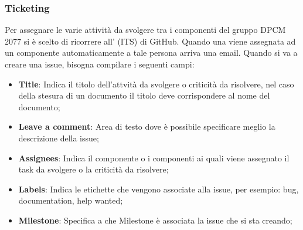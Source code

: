 \subsubsection{Ticketing}
Per assegnare le varie attività da svolgere tra i componenti del gruppo DPCM 2077 si è scelto di ricorrere all' (ITS) di GitHub.
Quando una  viene assegnata ad un componente automaticamente a tale persona arriva una email.
Quando si va a creare una issue, bisogna compilare i seguenti campi:
\begin{itemize}
\item{\textbf{Title}: Indica il titolo dell'attvità da svolgere o criticità da risolvere, nel caso della stesura di un documento il titolo deve corrispondere al nome del documento;}
\item{\textbf{Leave a comment}: Area di testo dove è possibile specificare meglio la descrizione della issue;}
\item{\textbf{Assignees}: Indica il componente o i componenti ai quali viene assegnato il task da svolgere o la criticità da risolvere;}
\item{\textbf{Labels}: Indica le etichette che vengono associate alla issue, per esempio: bug, documentation, help wanted;}
\item{\textbf{Milestone}: Specifica a che Milestone è associata la issue che si sta creando;}
\end{itemize} 

